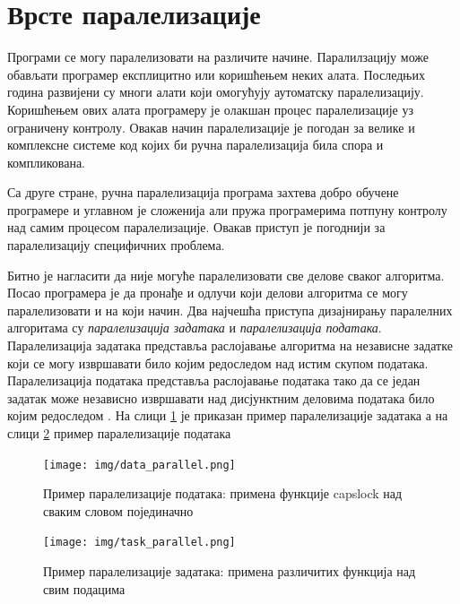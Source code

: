 \documentclass[12pt,oneside]{memoir}
\begin{document}
  \section{Врсте паралелизације}
  
 Програми се могу паралелизовати на различите начине. Паралилзацију може обављати програмер експлицитно или коришћењем неких алата. Последњих година развијени су многи алати који омогућују аутоматску паралелизацију. Коришћењем ових алата програмеру је олакшан процес паралелизације уз ограничену контролу. Овакав начин паралелизације је погодан за велике и комплексне системе код којих би ручна паралелизација била спора и компликована.
 
  Са друге стране, ручна паралелизација програма захтева добро обучене програмере и углавном је сложенија али пружа програмерима потпуну контролу над самим процесом паралелизације. Овакав приступ је погоднији за паралелизацију специфичних проблема.


  Битно је нагласити да није могуће паралелизовати све делове сваког алгоритма. Посао програмера је да пронађе и одлучи који делови алгоритма се могу паралелизовати и на који начин.
 Два најчешћа приступа дизајнирању паралелних алгоритама су \emph{паралелизација задатака} и \emph{паралелизација података}. 
Паралелизација задатака представља раслојавање алгоритма на независне задатке који се могу извршавати било којим редоследом над истим скупом података.
Паралелизација података представља раслојавање података тако да се један задатак може независно извршавати над дисјунктним деловима података било којим редоследом \cite{art_conc}. 
На слици  \ref{fig:data_parallel} је приказан пример паралелизације задатака а на слици \ref{fig:task_parallel} пример паралелизације података

\begin{figure}[!ht]
  \centering
  \texttt{[image: img/data\_parallel.png]}
  \caption{Пример паралелизације података: примена функције capslock над сваким словом појединачно}
  \label{fig:data_parallel}
\end{figure}

\begin{figure}[!ht]
  \centering
  \texttt{[image: img/task\_parallel.png]}
  \caption{Пример паралелизације задатака: примена различитих функција над свим подацима}
  \label{fig:task_parallel}
\end{figure}
\end{document}

